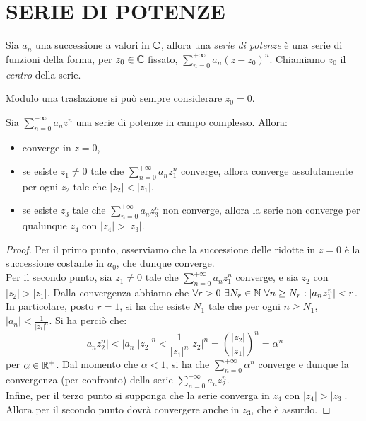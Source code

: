 \documentclass[Completo.tex]{subfiles}
\begin{document}
\section{SERIE DI POTENZE}
\begin{Def}
	Sia $a_n$ una successione a valori in $\bb[C]$, allora una \textit{serie di potenze} è una serie di funzioni della forma, per $z_0 \in \bb[C]$ fissato, $\sum_{n=0}^{+\infty} a_n(z-z_0)^n$. Chiamiamo $z_0$ il \textit{centro} della serie.
\end{Def}
\begin{Oss}
	Modulo una traslazione si può sempre considerare $z_0 = 0$.
\end{Oss}
\begin{eTh}
	Sia $\sum_{n=0}^{+\infty} a_nz^n$ una serie di potenze in campo complesso. Allora:
	\begin{itemize}
		\item converge in $z=0$,
		\item se esiste $z_1 \neq 0$ tale che $\sum_{n=0}^{+\infty} a_nz_1^n$ converge, allora converge assolutamente per ogni $z_2$ tale che $\vert z_2 \vert < \vert z_1 \vert$,
		\item se esiste $z_3$ tale che $\sum_{n=0}^{+\infty} a_nz_3^n$ non converge, allora la serie non converge per qualunque $z_4$ con $\vert z_4 \vert > \vert z_3 \vert$.
	\end{itemize}
\end{eTh}
\begin{proof}
	Per il primo punto, osserviamo che la successione delle ridotte in $z = 0$ è la successione costante in $a_0$, che dunque converge. \\
	Per il secondo punto, sia $z_1 \neq 0$ tale che $\sum_{n=0}^{+\infty} a_nz_1^n$ converge, e sia $z_2$ con $\vert z_2 \vert > \vert z_1 \vert$. Dalla convergenza abbiamo che $\forall r > 0 \ \exists N_r \in \bb[N] \ \forall n \geq N_r: \vert a_nz_1^n \vert < r$. In particolare, posto $r = 1$, si ha che esiste $N_1$ tale che per ogni $n \geq N_1$, $\vert a_n \vert < \frac{1}{\vert z_1 \vert^n}$. Si ha perciò che:
	\begin{equation*}
	\vert a_n z_2^n \vert < \vert a_n \vert \vert z_2 \vert^n < \frac{1}{\vert z_1 \vert^n} \vert z_2 \vert^n = \left(\frac{\vert z_2 \vert}{\vert z_1 \vert}\right)^n = \alpha^n
	\end{equation*}
	per $\alpha \in \bb[R]^+$. Dal momento che $\alpha < 1$, si ha che $\sum_{n=0}^{+\infty} \alpha^n$ converge e dunque la convergenza (per confronto) della serie $\sum_{n=0}^{+\infty} a_nz_2^n$. \\
	Infine, per il terzo punto si supponga che la serie converga in $z_4$ con $\vert z_4 \vert > \vert z_3 \vert$. Allora per il secondo punto dovrà convergere anche in $z_3$, che è assurdo.
\end{proof}
\end{document}
